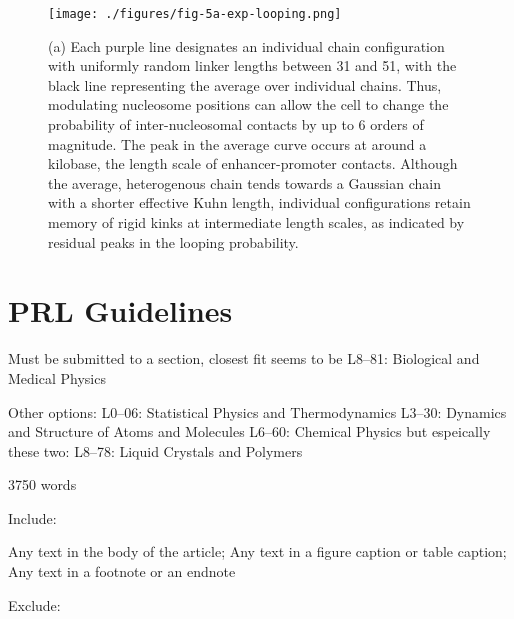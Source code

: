 \documentclass[%
 reprint,
superscriptaddress,
showpacs,preprintnumbers,
 amsmath,amssymb,
 aps,
 prl,
]{revtex4-1}
\begin{document}
\begin{figure}[t]
    \centering
    \texttt{[image: ./figures/fig-5a-exp-looping.png]}
    \caption{(a) Each purple line designates an individual chain configuration
    with uniformly random linker lengths between 31 and \SI{51}{\basepair}, with
    the black line representing the average over individual chains. Thus, modulating nucleosome positions can allow the cell to change
    the probability of inter-nucleosomal contacts by up to 6 orders of
    magnitude. The peak in the average curve occurs at around a kilobase, the
    length scale of enhancer-promoter contacts. Although the average,
    heterogenous chain tends towards a Gaussian chain with a shorter
    effective Kuhn length, individual configurations retain memory of rigid kinks
    at intermediate length scales, as indicated by residual peaks in the looping
    probability.}
\end{figure}

\section{PRL Guidelines}

Must be submitted to a section, closest fit seems to be
L8--81: Biological and Medical Physics

Other options:
L0--06: Statistical Physics and Thermodynamics
L3--30: Dynamics and Structure of Atoms and Molecules
L6--60: Chemical Physics
but espeically these two:
L8--78: Liquid Crystals and Polymers


3750 words

Include:

Any text in the body of the article;
Any text in a figure caption or table caption;
Any text in a footnote or an endnote

Exclude:
\end{document}
